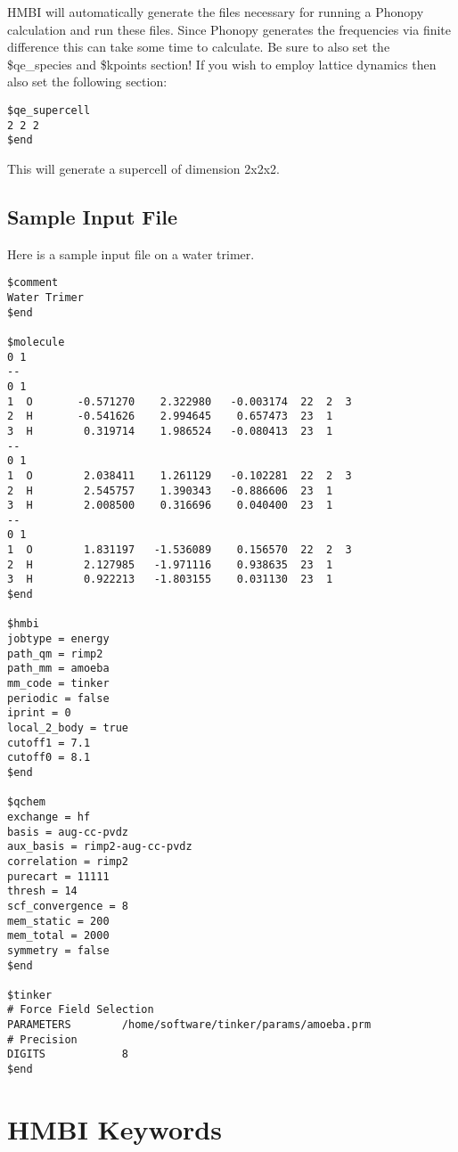 \documentclass[11pt,letterpaper]{article}
\begin{document}
\begin{spacing}{1.0}
HMBI will automatically generate the files necessary for running a Phonopy calculation and run these files. Since Phonopy generates the frequencies via finite difference this can take some time to calculate. Be sure to also set the \$qe\_species and \$kpoints section! If you wish to employ lattice dynamics then also set the following section:

\begin{verbatim}
$qe_supercell
2 2 2               
$end
\end{verbatim}

This will generate a supercell of dimension 2x2x2.

\subsection{Sample Input File}
Here is a sample input file on a water trimer.

\begin{verbatim}
$comment
Water Trimer
$end

$molecule
0 1
--
0 1
1  O       -0.571270    2.322980   -0.003174  22  2  3
2  H       -0.541626    2.994645    0.657473  23  1
3  H        0.319714    1.986524   -0.080413  23  1
--
0 1
1  O        2.038411    1.261129   -0.102281  22  2  3
2  H        2.545757    1.390343   -0.886606  23  1
3  H        2.008500    0.316696    0.040400  23  1
--
0 1
1  O        1.831197   -1.536089    0.156570  22  2  3
2  H        2.127985   -1.971116    0.938635  23  1
3  H        0.922213   -1.803155    0.031130  23  1
$end

$hmbi
jobtype = energy
path_qm = rimp2 
path_mm = amoeba
mm_code = tinker
periodic = false
iprint = 0
local_2_body = true
cutoff1 = 7.1
cutoff0 = 8.1
$end

$qchem
exchange = hf
basis = aug-cc-pvdz
aux_basis = rimp2-aug-cc-pvdz
correlation = rimp2
purecart = 11111
thresh = 14
scf_convergence = 8
mem_static = 200
mem_total = 2000
symmetry = false
$end

$tinker         
# Force Field Selection
PARAMETERS        /home/software/tinker/params/amoeba.prm
# Precision         
DIGITS            8
$end            
\end{verbatim}



\section{HMBI Keywords {\label{HMBI_keywords}}}


\end{spacing}
\end{document}
